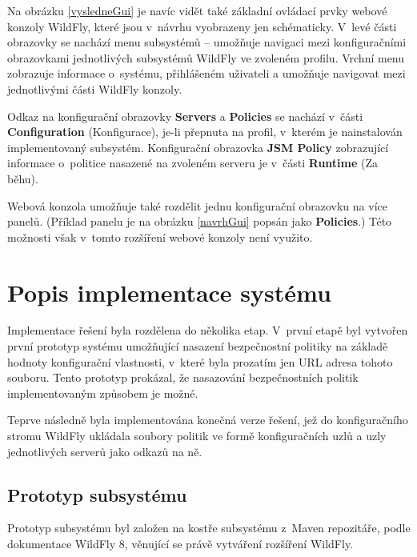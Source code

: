 Na obrázku \ref{vysledneGui} je navíc vidět také základní ovládací prvky webové konzoly WildFly, které jsou v~návrhu vyobrazeny jen schématicky.
V~levé části obrazovky se nachází menu subsystémů -- umožňuje navigaci mezi konfiguračními obrazovkami jednotlivých subsystémů WildFly ve zvoleném profilu.
Vrchní menu zobrazuje informace o~systému, přihlášeném uživateli a umožňuje navigovat mezi jednotlivými části WildFly konzoly.

Odkaz na konfigurační obrazovky {\bf Servers} a {\bf Policies} se nachází v~části {\bf Configuration} (Konfigurace), je-li přepnuta na profil, v~kterém je nainstalován implementovaný subsystém. Konfigurační obrazovka {\bf JSM Policy} zobrazující informace o~politice nasazené na zvoleném serveru je v~části {\bf Runtime} (Za běhu).

Webová konzola umožňuje také rozdělit jednu konfigurační obrazovku na více panelů. (Příklad panelu je na obrázku \ref{navrhGui} popsán jako {\bf Policies}.)
Této možnosti však v~tomto rozšíření webové konzoly není využito.

\chapter{Popis implementace systému} \label{implementace}

Implementace řešení byla rozdělena do několika etap. V~první etapě byl vytvořen první prototyp systému umožňující nasazení bezpečnostní politiky na základě hodnoty konfigurační vlastnosti, v~které byla prozatím jen URL adresa tohoto souboru. Tento prototyp prokázal, že nasazování bezpečnostních politik implementovaným způsobem je možné.

Teprve následně byla implementována konečná verze řešení, jež do konfiguračního stromu WildFly ukládala soubory politik ve formě konfiguračních uzlů a uzly jednotlivých serverů jako odkazů na ně.

\section{Prototyp subsystému} \label{prototyp}

Prototyp subsystému byl založen na kostře subsystému z~Maven repozitáře, podle dokumentace WildFly 8, věnující se právě vytváření rozšíření WildFly. \cite{WildFlyExtending}

